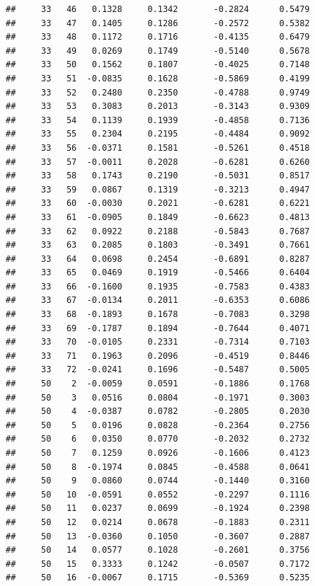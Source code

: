 \documentclass[
]{article}
\begin{document}
\begin{verbatim}
##     33   46   0.1328     0.1342       -0.2824      0.5479  
##     33   47   0.1405     0.1286       -0.2572      0.5382  
##     33   48   0.1172     0.1716       -0.4135      0.6479  
##     33   49   0.0269     0.1749       -0.5140      0.5678  
##     33   50   0.1562     0.1807       -0.4025      0.7148  
##     33   51  -0.0835     0.1628       -0.5869      0.4199  
##     33   52   0.2480     0.2350       -0.4788      0.9749  
##     33   53   0.3083     0.2013       -0.3143      0.9309  
##     33   54   0.1139     0.1939       -0.4858      0.7136  
##     33   55   0.2304     0.2195       -0.4484      0.9092  
##     33   56  -0.0371     0.1581       -0.5261      0.4518  
##     33   57  -0.0011     0.2028       -0.6281      0.6260  
##     33   58   0.1743     0.2190       -0.5031      0.8517  
##     33   59   0.0867     0.1319       -0.3213      0.4947  
##     33   60  -0.0030     0.2021       -0.6281      0.6221  
##     33   61  -0.0905     0.1849       -0.6623      0.4813  
##     33   62   0.0922     0.2188       -0.5843      0.7687  
##     33   63   0.2085     0.1803       -0.3491      0.7661  
##     33   64   0.0698     0.2454       -0.6891      0.8287  
##     33   65   0.0469     0.1919       -0.5466      0.6404  
##     33   66  -0.1600     0.1935       -0.7583      0.4383  
##     33   67  -0.0134     0.2011       -0.6353      0.6086  
##     33   68  -0.1893     0.1678       -0.7083      0.3298  
##     33   69  -0.1787     0.1894       -0.7644      0.4071  
##     33   70  -0.0105     0.2331       -0.7314      0.7103  
##     33   71   0.1963     0.2096       -0.4519      0.8446  
##     33   72  -0.0241     0.1696       -0.5487      0.5005  
##     50    2  -0.0059     0.0591       -0.1886      0.1768  
##     50    3   0.0516     0.0804       -0.1971      0.3003  
##     50    4  -0.0387     0.0782       -0.2805      0.2030  
##     50    5   0.0196     0.0828       -0.2364      0.2756  
##     50    6   0.0350     0.0770       -0.2032      0.2732  
##     50    7   0.1259     0.0926       -0.1606      0.4123  
##     50    8  -0.1974     0.0845       -0.4588      0.0641  
##     50    9   0.0860     0.0744       -0.1440      0.3160  
##     50   10  -0.0591     0.0552       -0.2297      0.1116  
##     50   11   0.0237     0.0699       -0.1924      0.2398  
##     50   12   0.0214     0.0678       -0.1883      0.2311  
##     50   13  -0.0360     0.1050       -0.3607      0.2887  
##     50   14   0.0577     0.1028       -0.2601      0.3756  
##     50   15   0.3333     0.1242       -0.0507      0.7172  
##     50   16  -0.0067     0.1715       -0.5369      0.5235  

\end{verbatim}
\end{document}
